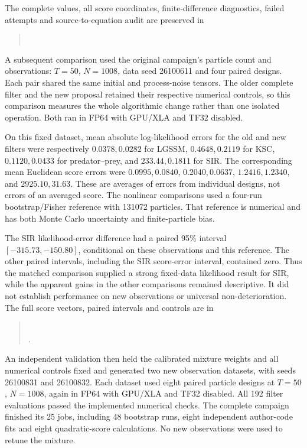 The complete values, all score coordinates, finite-difference diagnostics,
failed attempts and source-to-equation audit are preserved in
\begin{quote}\small
{}\\
\end{quote}

A subsequent comparison used the original campaign's particle count and
observations: \(T=50\), \(N=1008\), data seed 26100611 and four paired designs.
Each pair shared the same initial and process-noise tensors. The older complete
filter and the new proposal retained their respective numerical controls, so
this comparison measures the whole algorithmic change rather than one isolated
operation. Both ran in FP64 with GPU/XLA and TF32 disabled.

On this fixed dataset, mean absolute log-likelihood errors for the old and new
filters were respectively \(0.0378,0.0282\) for LGSSM,
\(0.4648,0.2119\) for KSC, \(0.1120,0.0433\) for predator--prey,
and \(233.44,0.1811\) for SIR. The corresponding mean Euclidean score errors
were \(0.0995,0.0840\), \(0.2040,0.0637\), \(1.2416,1.2340\),
and \(2925.10,31.63\). These are averages of errors from individual designs,
not errors of an averaged score. The nonlinear comparisons used a four-run
bootstrap/Fisher reference with 131072 particles. That reference is numerical
and has both Monte Carlo uncertainty and finite-particle bias.

The SIR likelihood-error difference had a paired 95\% interval
\([-315.73,-150.80]\), conditional on these observations and this reference.
The other paired intervals, including the SIR score-error interval, contained
zero. Thus the matched comparison supplied a strong fixed-data likelihood
result for SIR, while the apparent gains in the other comparisons remained
descriptive. It did not establish performance on new observations or universal
non-deterioration. The full score vectors, paired intervals and controls are in
\begin{quote}\small
{}\\
.
\end{quote}

An independent validation then held the calibrated mixture weights and all
numerical controls fixed and generated two new observation datasets, with seeds
26100831 and 26100832. Each dataset used eight paired particle designs at
\(T=50\), \(N=1008\), again in FP64 with GPU/XLA and TF32 disabled. All 192
filter evaluations passed the implemented numerical checks. The complete
campaign finished its 25 jobs, including 48 bootstrap runs, eight independent
author-code fits and eight quadratic-score calculations. No new observations
were used to retune the mixture.


